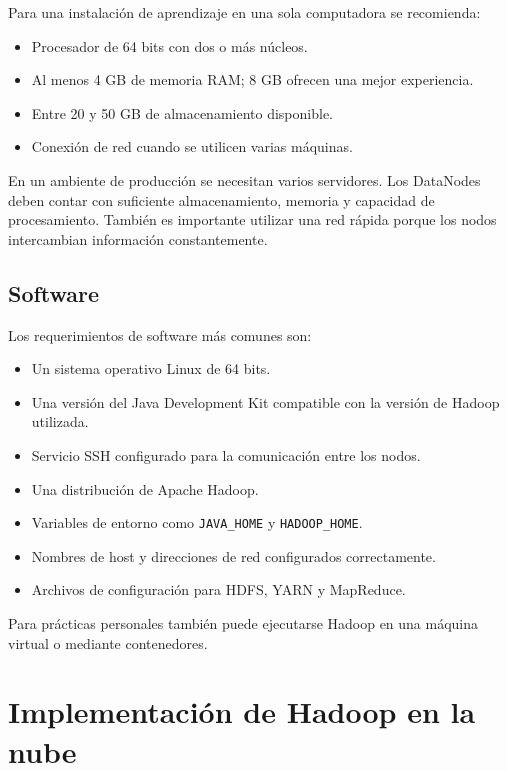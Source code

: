 Para una instalación de aprendizaje en una sola computadora se recomienda:

\begin{itemize}
    \item Procesador de 64 bits con dos o más núcleos.
    \item Al menos 4 GB de memoria RAM; 8 GB ofrecen una mejor experiencia.
    \item Entre 20 y 50 GB de almacenamiento disponible.
    \item Conexión de red cuando se utilicen varias máquinas.
\end{itemize}

En un ambiente de producción se necesitan varios servidores. Los DataNodes
deben contar con suficiente almacenamiento, memoria y capacidad de
procesamiento. También es importante utilizar una red rápida porque los nodos
intercambian información constantemente.

\subsection{Software}

Los requerimientos de software más comunes son:

\begin{itemize}
    \item Un sistema operativo Linux de 64 bits.
    \item Una versión del Java Development Kit compatible con la versión de
    Hadoop utilizada.
    \item Servicio SSH configurado para la comunicación entre los nodos.
    \item Una distribución de Apache Hadoop.
    \item Variables de entorno como \texttt{JAVA\_HOME} y
    \texttt{HADOOP\_HOME}.
    \item Nombres de host y direcciones de red configurados correctamente.
    \item Archivos de configuración para HDFS, YARN y MapReduce.
\end{itemize}

Para prácticas personales también puede ejecutarse Hadoop en una máquina
virtual o mediante contenedores.

\section{Implementación de Hadoop en la nube}

